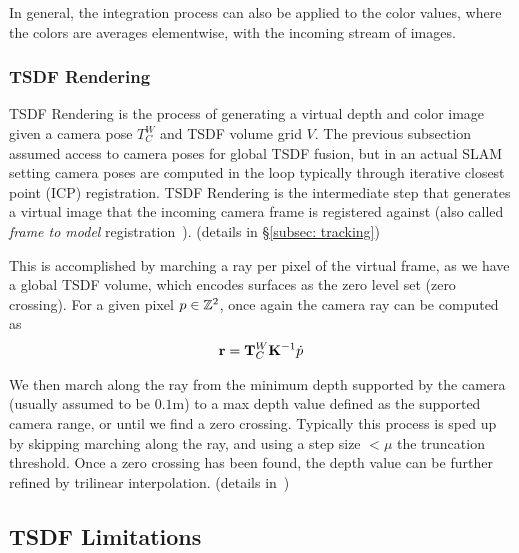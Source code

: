 In general, the integration process can also be applied to the color values, where the colors are averages elementwise, with the incoming stream of images.

\subsubsection{TSDF Rendering}

TSDF Rendering is the process of generating a virtual depth and color image given a camera pose $T_C^W$ and TSDF volume grid $V$. The previous subsection assumed access to camera poses for global TSDF fusion, but in an actual SLAM setting camera poses are computed in the loop typically through iterative closest point (ICP) registration. TSDF Rendering is the intermediate step that generates a virtual image that the incoming camera frame is registered against (also called \emph{frame to model} registration~\cite{newcombeKinectFusionRealtimeDense2011}). (details in \S\ref{subsec: tracking})

This is accomplished by marching a ray per pixel of the virtual frame, as we have a global TSDF volume, which encodes surfaces as the zero level set (zero crossing). For a given pixel $p \in \mathbb{Z}^2$, once again the camera ray can be computed as
\begin{align*}
    \mathbf{r} = \mathbf{T}_C^W \mathbf{K}^{-1} \dot{p}
\end{align*}

We then march along the ray from the minimum depth supported by the camera (usually assumed to be $0.1$m) to a max depth value defined as the supported camera range, or until we find a zero crossing. Typically this process is sped up by skipping marching along the ray, and using a step size $< \mu$ the truncation threshold. Once a zero crossing has been found, the depth value can be further refined by trilinear interpolation. (details in~\cite{newcombeKinectFusionRealtimeDense2011})

\subsection{TSDF Limitations}
